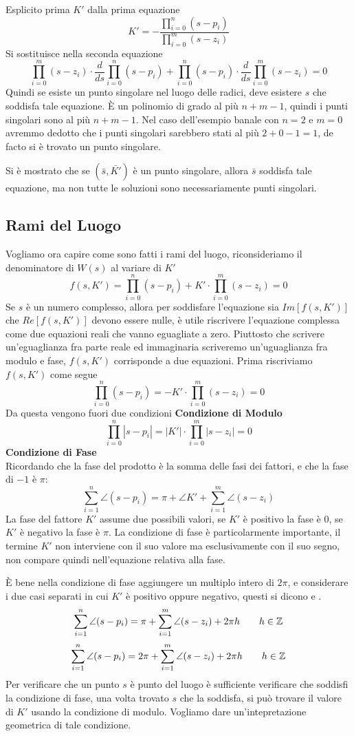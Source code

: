 \documentclass[10pt, letterpaper]{report}
\begin{document}
Esplicito prima $K'$ dalla prima equazione 
$$ 
K'=-\frac{\displaystyle\prod_{i=0}^n(s-p_i)}{\displaystyle\prod_{i=0}^m(s-z_i)}
$$
Si sostituisce nella seconda equazione
$$\displaystyle\prod_{i=0}^m(s-z_i)\cdot \dfrac{d}{ds}\displaystyle\prod_{i=0}^n(s-p_i) + \displaystyle\prod_{i=0}^n(s-p_i)\cdot \dfrac{d}{ds}\displaystyle\prod_{i=0}^m(s-z_i)=0$$
Quindi se esiste un punto singolare nel luogo delle radici, deve esistere $s$ che soddisfa tale equazione. È un polinomio di grado al più $n+m-1$, quindi i punti singolari sono al più 
$n+m-1$. Nel caso dell'esempio banale con $n=2$ e $m=0$  avremmo dedotto che i punti singolari sarebbero stati al più $2+0-1=1$, de facto si è trovato un punto singolare.\bigskip 

Si è mostrato che se $(\bar s,\bar{K'})$ è un punto singolare, allora $\bar s$ soddisfa tale equazione, ma non tutte le soluzioni sono necessariamente punti singolari. 
\subsection{Rami del Luogo}
Vogliamo ora capire come sono fatti i rami del luogo, riconsideriamo il denominatore di $W(s)$ al variare di $K'$
$$f(s,K')=\displaystyle\prod_{i=0}^n(s-p_i)+K'\cdot \displaystyle\prod_{i=0}^m(s-z_i)=0 $$
Se $s$ è un numero complesso, allora per soddisfare l'equazione sia $Im[f(s,K')]$ che $Re[f(s,K')]$ devono essere nulle, è utile riscrivere l'equazione complessa come due equazioni reali che vanno eguagliate a zero. Piuttosto che scrivere un'eguaglianza fra parte reale ed immaginaria scriveremo un'uguaglianza fra modulo e fase, $f(s,K')$ corrisponde a due equazioni. Prima riscriviamo $f(s,K')$ come segue 
$$ \displaystyle\prod_{i=0}^n(s-p_i)=-K'\cdot \displaystyle\prod_{i=0}^m(s-z_i)=0$$
Da questa vengono fuori due condizioni\acc 
\textbf{Condizione di Modulo}
$$ \displaystyle\prod_{i=0}^n|s-p_i|=|K'|\cdot \displaystyle\prod_{i=0}^m|s-z_i|=0$$
\textbf{Condizione di Fase}\\
Ricordando che la fase del prodotto è la somma delle fasi dei fattori, e che la fase di $-1$ è $\pi$: 
$$ \sum_{i=1}^n \angle{(s-p_i)}=\pi+\angle{K'}+ \sum_{i=1}^m \angle{(s-z_i)} $$
La fase del fattore $K'$ assume due possibili valori, se $K'$ è positivo la fase è 0, se $K'$ è negativo la fase è $\pi$. La condizione di fase è particolarmente importante, il termine $K'$ non interviene con il suo valore ma esclusivamente con il suo segno, non compare quindi nell'equazione relativa alla fase.\bigskip 

È bene nella condizione di fase aggiungere un multiplo intero di $2\pi$, e considerare i due casi separati in cui $K'$ è positivo oppure negativo, questi si dicono  e .
$$ \sum_{i=1}^n \angle{(s-p_i)}=\pi+ \sum_{i=1}^m \angle{(s-z_i)} +2\pi h \ \ \ \ \ \ h\in {\mathbb Z}$$
$$ \sum_{i=1}^n \angle{(s-p_i)}=2\pi+ \sum_{i=1}^m \angle{(s-z_i)} +2\pi h \ \ \ \ \ \ h\in {\mathbb Z}$$
Per verificare che un punto $s$ è punto del luogo è sufficiente verificare che soddisfi la condizione di fase, una volta trovato $s$ che la soddisfa, si può trovare il valore di $K'$ usando la condizione di modulo. Vogliamo dare un'intepretazione geometrica di tale condizione. \bigskip 
\end{document}
